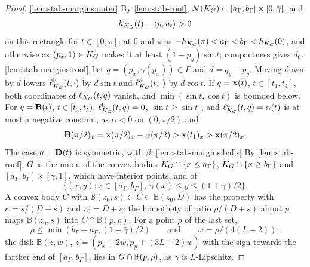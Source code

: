 \begin{proof}
\ref{lem:stab-margins:outer} By \cref{lem:stab-roof},
$\mathcal{N}(K_G)\subset[a_\Gamma,b_\Gamma]\times[0,\bar\gamma]$, and
\[
  h_{K_G}(t)-\langle p,u_t\rangle>0
\]
on this rectangle for $t\in[0,\pi]$: at $0$ and $\pi$ as
$-h_{K_G}(\pi)<a_\Gamma<b_\Gamma<h_{K_G}(0)$, and otherwise as $(p_x,1)\in K_G$
makes it at least $(1-p_y)\sin t$; compactness gives $d_0$.
\ref{lem:stab-margins:roof} Let $q=(p_x,\gamma(p_x))\in\Gamma$ and
$d=q_y-p_y$. Moving down by $d$ lowers $\ell^{\mathrm b}_{K_G}(t,\cdot)$ by
$d\sin t$ and $\ell^{\mathrm d}_{K_G}(t,\cdot)$ by $d\cos t$. If $q=\mathbf{x}(t)$,
$t\in[t_1,t_4]$, both coordinates of $\ell_{K_G}(t,q)$ vanish, and
$\min(\sin t,\cos t)$ is bounded below. For $q=\mathbf{B}(t)$, $t\in[t_3,t_5)$,
$\ell^{\mathrm b}_{K_G}(t,q)=0$, $\sin t\ge\sin t_1$, and
$\ell^{\mathrm d}_{K_G}(t,q)=\alpha(t)$ is at most a negative constant, as
$\alpha<0$ on $(0,\pi/2)$ and
\[
  \mathbf{B}(\pi/2)_x=\mathbf{x}(\pi/2)_x-\alpha(\pi/2)>\mathbf{x}(t_1)_x>\mathbf{x}(\pi/2)_x.
\]
The case $q=\mathbf{D}(t)$ is symmetric, with $\beta$. \ref{lem:stab-margins:balls} By
\cref{lem:stab-roof}, $G$ is the union of the convex bodies
$K_G\cap\{x\le a_\Gamma\}$, $K_G\cap\{x\ge b_\Gamma\}$ and
$[a_\Gamma,b_\Gamma]\times[\bar\gamma,1]$, which have interior points, and of
\[
  \{(x,y):x\in[a_\Gamma,b_\Gamma],\ \gamma(x)\le y\le(1+\bar\gamma)/2\}.
\]
A convex body $C$ with $\mathbb B(z_0,s)\subset C\subset\mathbb B(z_0,D)$ has
the property with $\kappa=s/(D+s)$ and $r_0=D+s$: the homothety of ratio
$\rho/(D+s)$ about $p$ maps $\mathbb B(z_0,s)$ into $C\cap\mathbb B(p,\rho)$.
For a point $p$ of the last set,
\[
  \rho\le\min(b_\Gamma-a_\Gamma,(1-\bar\gamma)/2)\qquad\text{and}\qquad
  w=\rho/(4(L+2)),
\]
the disk $\mathbb B(z,w)$, $z=(p_x\pm2w,p_y+(3L+2)w)$ with the sign towards the
farther end of $[a_\Gamma,b_\Gamma]$, lies in $G\cap\mathbb B(p,\rho)$, as
$\gamma$ is $L$-Lipschitz.
\end{proof}

